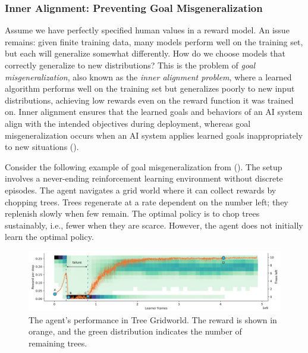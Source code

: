 \documentclass[
  letterpaper,
  DIV=11,
  numbers=noendperiod,
  oneside]{scrreprt}
\theoremstyle{remark}
\begin{document}
\subsubsection{Inner Alignment: Preventing Goal
Misgeneralization}\label{inner-alignment-preventing-goal-misgeneralization}

Assume we have perfectly specified human values in a reward model. An
issue remains: given finite training data, many models perform well on
the training set, but each will generalize somewhat differently. How do
we choose models that correctly generalize to new distributions? This is
the problem of \emph{goal misgeneralization}, also known as the
\emph{inner alignment problem}, where a learned algorithm performs well
on the training set but generalizes poorly to new input distributions,
achieving low rewards even on the reward function it was trained on.
Inner alignment ensures that the learned goals and behaviors of an AI
system align with the intended objectives during deployment, whereas
goal misgeneralization occurs when an AI system applies learned goals
inappropriately to new situations
().

Consider the following example of goal misgeneralization from
(). The setup involves a
never-ending reinforcement learning environment without discrete
episodes. The agent navigates a grid world where it can collect rewards
by chopping trees. Trees regenerate at a rate dependent on the number
left; they replenish slowly when few remain. The optimal policy is to
chop trees sustainably, i.e., fewer when they are scarce. However, the
agent does not initially learn the optimal policy.

\begin{figure}

{\centering \includegraphics{Figures/tree-gridworld.jpeg}

}

\caption{The agent's performance in Tree Gridworld. The reward is shown
in orange, and the green distribution indicates the number of remaining
trees.}

\end{figure}%
\end{document}
